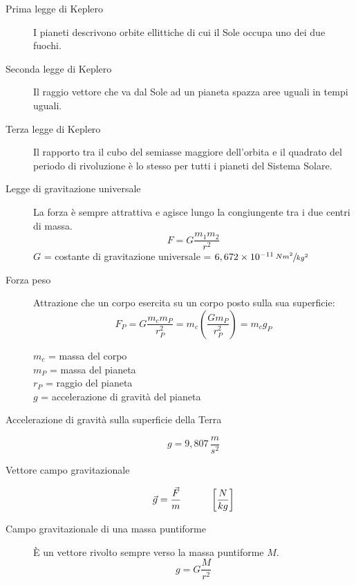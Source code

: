 \documentclass[a4paper,11pt,italian]{article}
\begin{document}
\begin{description}
  \item[Prima legge di Keplero]  
  I pianeti descrivono orbite ellittiche di cui il Sole occupa uno dei due fuochi.
  
  \item[Seconda legge di Keplero] 
  Il raggio vettore che va dal Sole ad un pianeta spazza aree uguali in tempi uguali.
  
  \item[Terza legge di Keplero] 
  Il rapporto tra il cubo del semiasse maggiore dell'orbita e il quadrato del periodo di rivoluzione è lo stesso per tutti i pianeti del Sistema Solare.
  
  \item[Legge di gravitazione universale] 
  La forza è sempre attrattiva e agisce lungo la congiungente tra i due centri di massa. 
  \[ F = G \frac{m_1 m_2}{r^2} \]
  $ G $ = costante di gravitazione universale = $ 6,672 \times 10^{-11} \, \sfrac{Nm^2}{kg^2} $
  
  \item[Forza peso] 
  Attrazione che un corpo esercita su un corpo posto sulla sua superficie: 
  \[ F_P = G \frac{m_{c} m_{P}}{r^2_{P}} =  m_{c} \left(\frac{G m_{P}}{r^2_{P}} \right) = m_{c} g_P \]
  \begin{multicols}{2}
  $ m_c $ = massa del corpo\\
  $ m_P $ = massa del pianeta\\
  $ r_P $ = raggio del pianeta\\
  $ g $ = accelerazione di gravità del pianeta
  \end{multicols}
  
  \item[Accelerazione di gravità sulla superficie della Terra] 
  \[ g =  9, 807 \, \frac{m}{s^2} \]
  
  \item[Vettore campo gravitazionale] 
  \[ \vec{g} = \frac{\vec{F}}{m} \hspace*{3em} \left[ \frac{N}{kg} \right] \]
  
  \item[Campo gravitazionale di una massa puntiforme] 
  È un vettore rivolto sempre verso la massa puntiforme $ M $.
  \[ g = G \frac{M}{r^2} \]

%   
%   
  

\end{description}
\end{document}
